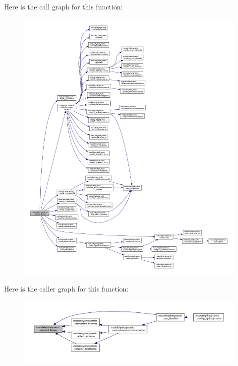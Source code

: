 Here is the call graph for this function\+:\nopagebreak
\begin{figure}[H]
\begin{center}
\leavevmode
\includegraphics[width=350pt]{namespacemodulehydrodynamic_a789f1e7896025efc57bee4107cc31422_cgraph}
\end{center}
\end{figure}
Here is the caller graph for this function\+:\nopagebreak
\begin{figure}[H]
\begin{center}
\leavevmode
\includegraphics[width=350pt]{namespacemodulehydrodynamic_a789f1e7896025efc57bee4107cc31422_icgraph}
\end{center}
\end{figure}
\mbox{\label{namespacemodulehydrodynamic_a752353d6a88048109cbe1a037fe56ef7}} 
